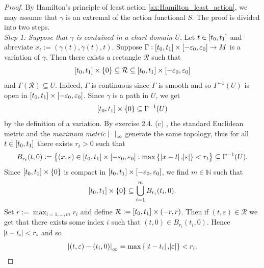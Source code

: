 \begin{proof}
	By Hamilton's principle of least action \ref{ax:Hamilton_least_action}, we may assume that $\gamma$ is an extremal of the action functional $S$. The proof is divided into two steps.\\
	\emph{Step 1: Suppose that $\gamma$ is contained in a chart domain $U$.} Let $t \in \intcc[0]{t_0,t_1}$ and abreviate $x_t := (\gamma(t),\dot{\gamma}(t),t)$. Suppose $\Gamma : \intcc[0]{t_0,t_1} \times \intcc[0]{-\varepsilon_0,\varepsilon_0} \to M$ is a variation of $\gamma$. Then there exists a rectangle $\mathcal{R}$ such that
	\begin{equation*}
		\intcc[0]{t_0,t_1} \times \cbr[0]{0} \subseteq \mathcal{R} \subseteq \intcc[0]{t_0,t_1} \times \intcc[0]{-\varepsilon_0,\varepsilon_0} 
	\end{equation*} 
	\noindent and $\Gamma(\mathcal{R}) \subseteq U$. Indeed, $\Gamma$ is continuous since $\Gamma$ is smooth and so $\Gamma^{-1}(U)$ is open in $\intcc[0]{t_0,t_1} \times \intcc[0]{-\varepsilon_0,\varepsilon_0}$. Since $\gamma$ is a path in $U$, we get
	\begin{equation*}
		\intcc[0]{t_0,t_1} \times \cbr{0} \subseteq \Gamma^{-1}(U)
	\end{equation*}
	\noindent by the definition of a variation. By exercise 2.4. (c) \cite[22]{lee:topological_manifolds:2011}, the standard Euclidean metric and the \emph{maximum metric $\abs{\>\cdot\>}_\infty$} generate the same topology, thus for all $t \in \intcc[0]{t_0,t_1}$ there exists $r_t > 0$ such that
	\begin{equation*}
		B_{r_t}(t,0) := \cbr[1]{(x,\varepsilon) \in \intcc[0]{t_0,t_1} \times \intcc[0]{-\varepsilon_0,\varepsilon_0} : \max\cbr[0]{\>\abs{x - t},\abs{\varepsilon}} < r_t} \subseteq \Gamma^{-1}(U).
	\end{equation*}
	Since $\intcc[0]{t_0,t_1} \times \cbr[0]{0}$ is compact in $\intcc[0]{t_0,t_1} \times \intcc[0]{-\varepsilon_0,\varepsilon_0}$, we find $m \in \mathbb{N}$ such that 
	\begin{equation*}
		\intcc[0]{t_0,t_1} \times \cbr[0]{0} \subseteq \bigcup_{i = 1}^m B_{r_i}(t_i,0).
	\end{equation*}
	Set $r := \max_{i = 1,\dots,m} r_i$ and define $\mathcal{R} := \intcc[0]{t_0,t_1} \times \intoo[0]{-r,r}$. Then if $(t,\varepsilon) \in \mathcal{R}$ we get that there exists some index $i$ such that $(t,0) \in B_{r_i}(t_i,0)$. Hence $\abs{t - t_i} < r_i$ and so
	\begin{equation*}
		\abs[0]{(t,\varepsilon) - (t_i,0)}_\infty = \max\cbr[0]{\> \abs{t - t_i},\abs{\varepsilon}} < r_i.

\end{equation*}
\end{proof}
